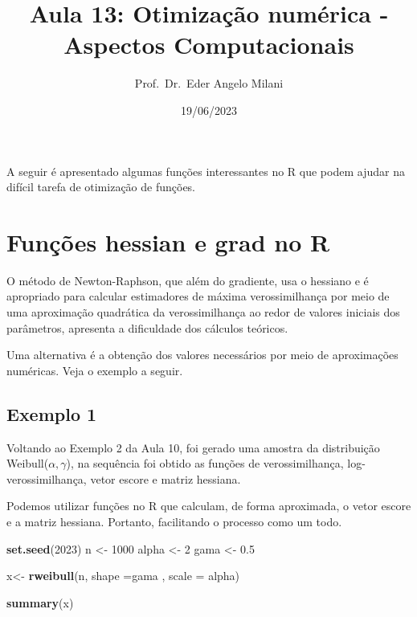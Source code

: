 \documentclass[
]{article}
\title{Aula 13: Otimização numérica - Aspectos Computacionais}
\author{Prof.~Dr.~Eder Angelo Milani}
\date{19/06/2023}
\newenvironment{Shaded}{\begin{snugshade}}{\end{snugshade}}
\newcommand{\AttributeTok}[1]{\textcolor[rgb]{0.13,0.29,0.53}{#1}}
\newcommand{\DecValTok}[1]{\textcolor[rgb]{0.00,0.00,0.81}{#1}}
\newcommand{\FloatTok}[1]{\textcolor[rgb]{0.00,0.00,0.81}{#1}}
\newcommand{\FunctionTok}[1]{\textcolor[rgb]{0.13,0.29,0.53}{\textbf{#1}}}
\newcommand{\NormalTok}[1]{#1}
\newcommand{\OtherTok}[1]{\textcolor[rgb]{0.56,0.35,0.01}{#1}}
\begin{document}
\maketitle

A seguir é apresentado algumas funções interessantes no R que podem
ajudar na difícil tarefa de otimização de funções.

\hypertarget{funuxe7uxf5es-hessian-e-grad-no-r}{%
\section{Funções hessian e grad no
R}\label{funuxe7uxf5es-hessian-e-grad-no-r}}

O método de Newton-Raphson, que além do gradiente, usa o hessiano e é
apropriado para calcular estimadores de máxima verossimilhança por meio
de uma aproximação quadrática da verossimilhança ao redor de valores
iniciais dos parâmetros, apresenta a dificuldade dos cálculos teóricos.

Uma alternativa é a obtenção dos valores necessários por meio de
aproximações numéricas. Veja o exemplo a seguir.

\hypertarget{exemplo-1}{%
\subsection{Exemplo 1}\label{exemplo-1}}

Voltando ao Exemplo 2 da Aula 10, foi gerado uma amostra da distribuição
Weibull(\(\alpha, \gamma\)), na sequência foi obtido as funções de
verossimilhança, log-verossimilhança, vetor escore e matriz hessiana.

Podemos utilizar funções no R que calculam, de forma aproximada, o vetor
escore e a matriz hessiana. Portanto, facilitando o processo como um
todo.

\begin{Shaded}
\begin{Highlighting}[]
\FunctionTok{set.seed}\NormalTok{(}\DecValTok{2023}\NormalTok{)}
\NormalTok{n }\OtherTok{\textless{}{-}} \DecValTok{1000}
\NormalTok{alpha }\OtherTok{\textless{}{-}} \DecValTok{2}
\NormalTok{gama }\OtherTok{\textless{}{-}} \FloatTok{0.5}

\NormalTok{x}\OtherTok{\textless{}{-}} \FunctionTok{rweibull}\NormalTok{(n, }\AttributeTok{shape =}\NormalTok{gama , }\AttributeTok{scale =}\NormalTok{ alpha)}

\FunctionTok{summary}\NormalTok{(x)}
\end{Highlighting}
\end{Shaded}
\end{document}
